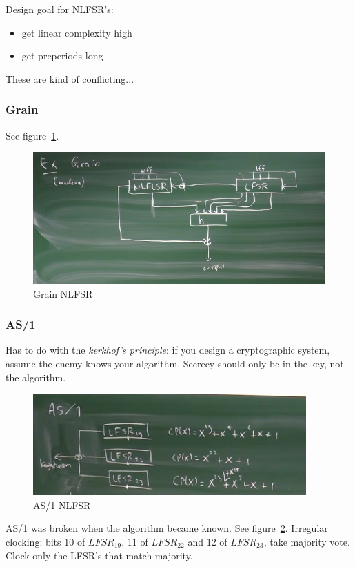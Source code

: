 \documentclass[language=english,number=]{homework}
\begin{document}
Design goal for NLFSR's:
\begin{itemize}
\item get linear complexity high
\item get preperiods long
\end{itemize}
These are kind of conflicting...

\subsubsection{Grain}
See figure~\ref{grain}.

\begin{figure}[h!]
\centering
\includegraphics[width=\textwidth]{grain.PNG}
\caption{Grain NLFSR}
\label{grain}
\end{figure}

\subsubsection{AS/1}
Has to do with the \emph{kerkhof's principle}: if you design a cryptographic system, assume the enemy knows your algorithm.
Secrecy should only be in the key, not the algorithm.

\begin{figure}[h!]
\centering
\includegraphics[width=\textwidth]{as1.PNG}
\caption{AS/1 NLFSR}
\label{as1}
\end{figure}

AS/1 was broken when the algorithm became known.
See figure~\ref{as1}.
Irregular clocking: bits 10 of $LFSR_{19}$, 11 of $LFSR_{22}$ and 12 of $LFSR_{23}$, take majority vote.
Clock only the LFSR's that match majority.
\end{document}
